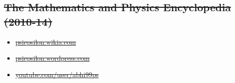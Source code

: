 \documentclass{article}
\newcommand{\disown}[1]{\sout{#1}}
\newcommand{\archive}{\color{lightgray}}
\begin{document}
{\archive

\subsection*{\disown{The Mathematics and Physics Encyclopedia (2010-14)}}

\begin{itemize}
    \item \disown{\href{https://psiepsilon.wikia.com}{psiepsilon.wikia.com}}
    \item \disown{\href{https://psiepsilon.wordpress.com}{psiepsilon.wordpress.com}}
    \item \disown{\href{https://www.youtube.com/user/abhi99ps}{youtube.com/user/abhi99ps}}
\end{itemize}

}
\end{document}
